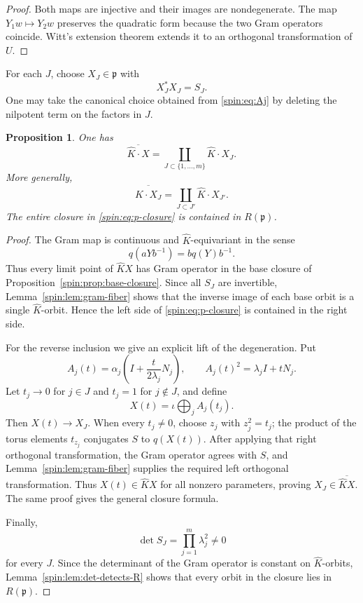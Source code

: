 \documentclass[10pt,a4paper]{amsart}
\numberwithin{equation}{section}
\newtheorem{proposition}[theorem]{Proposition}
\newcommand{\fp}{\mathfrak p}
\begin{document}
\begin{proof}
Both maps are injective and their images are nondegenerate.  The map
$Y_1w\mapsto Y_2w$ preserves the quadratic form because the two Gram
operators coincide.  Witt's extension theorem extends it to an orthogonal
transformation of $U$.
\end{proof}

For each $J$, choose $X_J\in\fp$ with
\[
  X_J^*X_J=S_J.
\]
One may take the canonical choice obtained from \eqref{spin:eq:Aj} by deleting the
nilpotent term on the factors in $J$.

\begin{proposition}\label{spin:prop:p-closure}
One has
\begin{equation}\label{spin:eq:p-closure}
  \overline{\widehat K\cdot X}
  =
  \coprod_{J\subset\{1,\ldots,m\}}
  \widehat K\cdot X_J.
\end{equation}
More generally,
\[
  \overline{\widehat K\cdot X_J}
  =
  \coprod_{J\subset J'}\widehat K\cdot X_{J'}.
\]
The entire closure in \eqref{spin:eq:p-closure} is contained in $R(\fp)$.
\end{proposition}

\begin{proof}
The Gram map is continuous and $\widehat K$-equivariant in the sense
\[
  q(aYb^{-1})=bq(Y)b^{-1}.
\]
Thus every limit point of $\widehat KX$ has Gram operator in the base closure
of Proposition~\ref{spin:prop:base-closure}.  Since all $S_J$ are invertible,
Lemma~\ref{spin:lem:gram-fiber} shows that the inverse image of each base orbit is a
single $\widehat K$-orbit.  Hence the left side of \eqref{spin:eq:p-closure} is
contained in the right side.

For the reverse inclusion we give an explicit lift of the degeneration.  Put
\[
  A_j(t)=\alpha_j
  \left(I+\frac{t}{2\lambda_j}N_j\right),
  \qquad
  A_j(t)^2=\lambda_jI+tN_j.
\]
Let $t_j\to0$ for $j\in J$ and $t_j=1$ for $j\notin J$, and define
\[
  X(t)=\iota\bigoplus_jA_j(t_j).
\]
Then $X(t)\to X_J$.  When every $t_j\ne0$, choose $z_j$ with $z_j^2=t_j$;
the product of the torus elements $t_{z_j}$ conjugates $S$ to $q(X(t))$.
After applying that right orthogonal transformation, the Gram operator agrees
with $S$, and Lemma~\ref{spin:lem:gram-fiber} supplies the required left
orthogonal transformation.  Thus $X(t)\in\widehat KX$ for all nonzero
parameters, proving $X_J\in\overline{\widehat KX}$.  The same proof gives the
general closure formula.

Finally,
\[
  \det S_J=\prod_{j=1}^m\lambda_j^2\ne0
\]
for every $J$.  Since the determinant of the Gram operator is constant on
$\widehat K$-orbits, Lemma~\ref{spin:lem:det-detects-R} shows that every orbit in
the closure lies in $R(\fp)$.
\end{proof}
\end{document}
